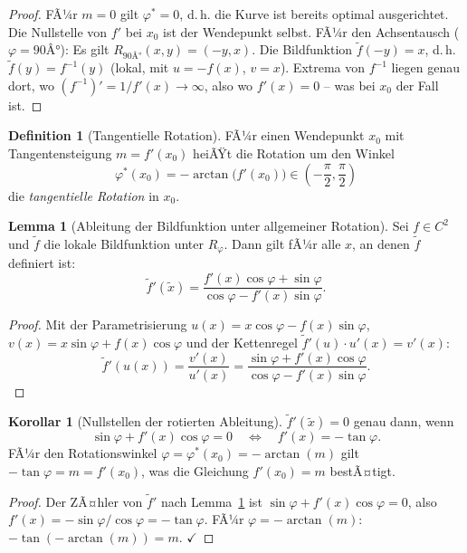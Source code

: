 ﻿\documentclass[12pt, a4paper]{article}
\theoremstyle{definition}
\newtheorem{definition}{Definition}[section]
\newtheorem{lemma}{Lemma}[section]
\newtheorem{korollar}{Korollar}[section]
\begin{document}
	\begin{proof}
		FÃ¼r $m = 0$ gilt $\varphi^* = 0$, d.\,h. die Kurve ist bereits optimal
		ausgerichtet. Die Nullstelle von $f'$ bei $x_0$ ist der Wendepunkt selbst.
		FÃ¼r den Achsentausch ($\varphi = 90Â°$): Es gilt
		$R_{90Â°}(x, y) = (-y, x)$. Die Bildfunktion $\tilde{f}(-y) = x$,
		d.\,h. $\tilde{f}(y) = f^{-1}(y)$ (lokal, mit $u = -f(x)$, $v = x$).
		Extrema von $f^{-1}$ liegen genau dort, wo $(f^{-1})' = 1/f'(x) \to \infty$,
		also wo $f'(x) = 0$ -- was bei $x_0$ der Fall ist.
	\end{proof}
	
	\begin{definition}[Tangentielle Rotation]\label{def:tangentiell}
		FÃ¼r einen Wendepunkt $x_0$ mit Tangentensteigung $m = f'(x_0)$ heiÃŸt die
		Rotation um den Winkel
		\[
		\varphi^*(x_0) = -\arctan\!\bigl(f'(x_0)\bigr) \in \left(-\frac{\pi}{2}, \frac{\pi}{2}\right)
		\]
		die \emph{tangentielle Rotation} in $x_0$.
	\end{definition}
	
	\begin{lemma}[Ableitung der Bildfunktion unter allgemeiner Rotation]
		\label{lem:ableitung}
		Sei $f \in C^2$ und $\tilde{f}$ die lokale Bildfunktion unter $R_\varphi$.
		Dann gilt fÃ¼r alle $x$, an denen $\tilde{f}$ definiert ist:
		\[
		\tilde{f}'(\tilde{x}) = \frac{f'(x)\cos\varphi + \sin\varphi}{\cos\varphi - f'(x)\sin\varphi}.
		\]
	\end{lemma}
	
	\begin{proof}
		Mit der Parametrisierung $u(x) = x\cos\varphi - f(x)\sin\varphi$,
		$v(x) = x\sin\varphi + f(x)\cos\varphi$ und der Kettenregel
		$\tilde{f}'(u)\cdot u'(x) = v'(x)$:
		\[
		\tilde{f}'(u(x)) = \frac{v'(x)}{u'(x)}
		= \frac{\sin\varphi + f'(x)\cos\varphi}{\cos\varphi - f'(x)\sin\varphi}.
		\]
	\end{proof}
	
	\begin{korollar}[Nullstellen der rotierten Ableitung]\label{kor:nullstellen}
		$\tilde{f}'(\tilde{x}) = 0$ genau dann, wenn
		\[
		\sin\varphi + f'(x)\cos\varphi = 0
		\quad\Longleftrightarrow\quad
		f'(x) = -\tan\varphi.
		\]
		FÃ¼r den Rotationswinkel $\varphi = \varphi^*(x_0) = -\arctan(m)$ gilt
		$-\tan\varphi = m = f'(x_0)$, was die Gleichung $f'(x_0) = m$ bestÃ¤tigt.
	\end{korollar}
	
	\begin{proof}
		Der ZÃ¤hler von $\tilde{f}'$ nach Lemma~\ref{lem:ableitung} ist
		$\sin\varphi + f'(x)\cos\varphi = 0$, also $f'(x) = -\sin\varphi/\cos\varphi = -\tan\varphi$.
		FÃ¼r $\varphi = -\arctan(m)$: $-\tan(-\arctan(m)) = m$. $\checkmark$
	\end{proof}
	
\end{document}
